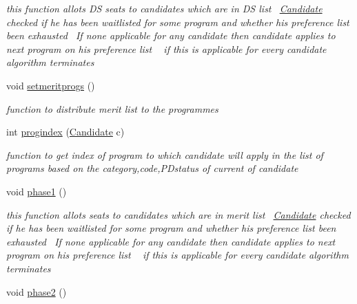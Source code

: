 \begin{DoxyCompactItemize}
\begin{DoxyCompactList}\small\item\em this function allots D\+S seats to candidates which are in D\+S list~\newline
 \hyperlink{classalgo1_1_1Candidate}{Candidate} checked if he has been waitlisted for some program and whether his preference list been exhausted~\newline
 If none applicable for any candidate then candidate applies to next program on his preference list ~\newline
 if this is applicable for every candidate algorithm terminates \end{DoxyCompactList}\item 
\hypertarget{classalgo1_1_1GaleShapleyAdmission_a62bbe0a8daac08e2c47a4f74f4093f70}{void \hyperlink{classalgo1_1_1GaleShapleyAdmission_a62bbe0a8daac08e2c47a4f74f4093f70}{setmeritprogs} ()}\label{classalgo1_1_1GaleShapleyAdmission_a62bbe0a8daac08e2c47a4f74f4093f70}

\begin{DoxyCompactList}\small\item\em function to distribute merit list to the programmes \end{DoxyCompactList}\item 
int \hyperlink{classalgo1_1_1GaleShapleyAdmission_ad062c42d3c81430fd44880eda3c9e438}{progindex} (\hyperlink{classalgo1_1_1Candidate}{Candidate} c)
\begin{DoxyCompactList}\small\item\em function to get index of program to which candidate will apply in the list of programs based on the category,code,P\+Dstatus of current of candidate~\newline
 \end{DoxyCompactList}\item 
\hypertarget{classalgo1_1_1GaleShapleyAdmission_a2d57927ddc6ca74ab249b032a1eed4c7}{void \hyperlink{classalgo1_1_1GaleShapleyAdmission_a2d57927ddc6ca74ab249b032a1eed4c7}{phase1} ()}\label{classalgo1_1_1GaleShapleyAdmission_a2d57927ddc6ca74ab249b032a1eed4c7}

\begin{DoxyCompactList}\small\item\em this function allots seats to candidates which are in merit list~\newline
 \hyperlink{classalgo1_1_1Candidate}{Candidate} checked if he has been waitlisted for some program and whether his preference list been exhausted~\newline
 If none applicable for any candidate then candidate applies to next program on his preference list ~\newline
 if this is applicable for every candidate algorithm terminates \end{DoxyCompactList}\item 
\hypertarget{classalgo1_1_1GaleShapleyAdmission_a573830fcb25d126a88f81fb198492fd1}{void \hyperlink{classalgo1_1_1GaleShapleyAdmission_a573830fcb25d126a88f81fb198492fd1}{phase2} ()}\label{classalgo1_1_1GaleShapleyAdmission_a573830fcb25d126a88f81fb198492fd1}


\end{DoxyCompactItemize}
